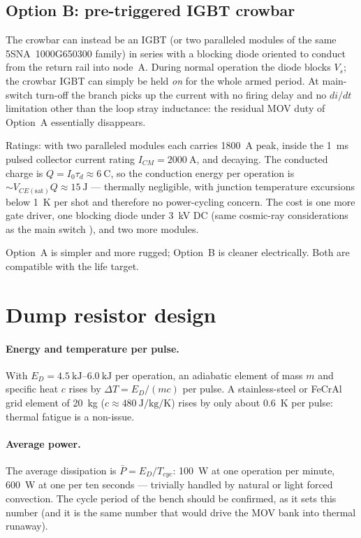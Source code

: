 \documentclass[11pt,a4paper]{article}
\begin{document}
\subsection{Option B: pre-triggered IGBT crowbar}
\label{sec:optB}

The crowbar can instead be an IGBT (or two paralleled modules of the same
5SNA~1000G650300 family) in series with a blocking diode oriented to conduct
from the return rail into node~A. During normal operation the diode blocks
$V_s$; the crowbar IGBT can simply be held \emph{on} for the whole armed
period. At main-switch turn-off the branch picks up the current with no
firing delay and no $di/dt$ limitation other than the loop stray inductance:
the residual MOV duty of Option~A essentially disappears.

Ratings: with two paralleled modules each carries \SI{1800}{\ampere} peak,
inside the \SI{1}{\milli\second} pulsed collector current rating
$I_{CM}=\SI{2000}{\ampere}$, and decaying. The conducted charge is
$Q = I_0 \tau_d \approx \SI{6}{\coulomb}$, so the conduction energy per
operation is $\sim V_{CE(\mathrm{sat})} Q \approx \SI{15}{\joule}$ ---
thermally negligible, with junction temperature excursions below
\SI{1}{\kelvin} per shot and therefore no power-cycling concern. The cost is
one more gate driver, one blocking diode under \SI{3}{\kilo\volt} DC (same
cosmic-ray considerations as the main switch \cite{voltrat}), and two more
modules.

Option~A is simpler and more rugged; Option~B is cleaner electrically. Both
are compatible with the life target.

\section{Dump resistor design}
\label{sec:resistor}

\paragraph{Energy and temperature per pulse.} With
$E_D=\SIrange{4.5}{6.0}{\kilo\joule}$ per operation, an adiabatic element of
mass $m$ and specific heat $c$ rises by $\Delta T = E_D/(m c)$ per pulse.
A stainless-steel or FeCrAl grid element of \SI{20}{\kilogram}
($c\approx\SI{480}{\joule\per\kilogram\per\kelvin}$) rises by only about
\SI{0.6}{\kelvin} per pulse: thermal fatigue is a non-issue.

\paragraph{Average power.} The average dissipation is $\bar P = E_D/T_{cyc}$:
\SI{100}{\watt} at one operation per minute, \SI{600}{\watt} at one per ten
seconds --- trivially handled by natural or light forced convection. The
cycle period of the bench should be confirmed, as it sets this number (and it
is the same number that would drive the MOV bank into thermal runaway).
\end{document}
